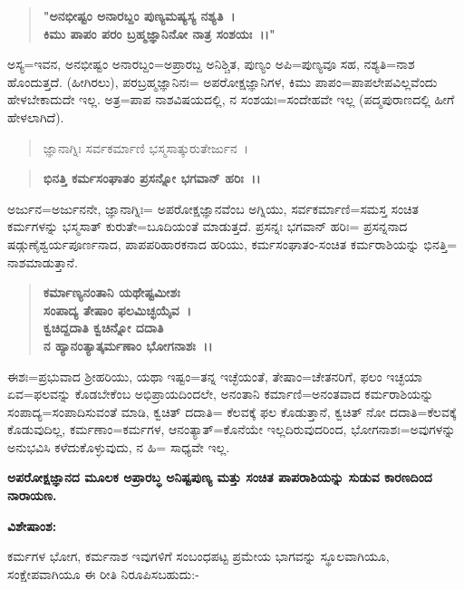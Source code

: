 \begin{verse}
\textbf{"ಅನಭೀಷ್ಟಂ ಅನಾರಬ್ದಂ ಪುಣ್ಯಮಷ್ಯಸ್ಯ ನಶ್ಯತಿ~।}\\\textbf{ಕಿಮು ಪಾಪಂ ಪರಂ ಬ್ರಹ್ಮಜ್ಞಾನಿನೋ ನಾತ್ರ ಸಂಶಯಃ~।।"}
\end{verse}


ಅಸ್ಯ=ಇವನ, ಅನಭೀಷ್ಟಂ ಅನಾರಬ್ದಂ=ಅಪ್ರಾರಬ್ದ ಅನಿಶ್ಚಿತ, ಪುಣ್ಯಂ ಅಪಿ=ಪುಣ್ಯವೂ ಸಹ, ನಶ್ಯತಿ=ನಾಶ ಹೊಂದುತ್ತದೆ. (ಹೀಗಿರಲು), ಪರಬ್ರಹ್ಮಜ್ಞಾನಿನಃ= ಅಪರೋಕ್ಷಜ್ಞಾನಿಗಳ, ಕಿಮು ಪಾಪಂ=ಪಾಪಲೇಪವಿಲ್ಲವೆಂದು ಹೇಳಬೇಕಾದುದೇ ಇಲ್ಲ. ಅತ್ರ=ಪಾಪ ನಾಶವಿಷಯದಲ್ಲಿ, ನ ಸಂಶಯಃ=ಸಂದೇಹವೇ ಇಲ್ಲ (ಪದ್ಮಪುರಾಣದಲ್ಲಿ ಹೀಗೆ ಹೇಳಲಾಗಿದೆ).

\begin{verse}
ಜ್ಞಾನಾಗ್ನಿಃ ಸರ್ವಕರ್ಮಾಣಿ ಭಸ್ಮಸಾತ್ಕುರುತೇರ್ಜುನ~।
\end{verse}


\begin{verse}
\textbf{ಭಿನತ್ತಿ ಕರ್ಮಸಂಘಾತಂ ಪ್ರಸನ್ನೋ ಭಗವಾನ್ ಹರಿಃ~।।}
\end{verse}

ಅರ್ಜುನ=ಅರ್ಜುನನೇ, ಜ್ಞಾನಾಗ್ನಿಃ= ಅಪರೋಕ್ಷಜ್ಞಾನವೆಂಬ ಅಗ್ನಿಯು, ಸರ್ವ\break ಕರ್ಮಾಣಿ=ಸಮಸ್ತ ಸಂಚಿತ ಕರ್ಮಗಳನ್ನು ಭಸ್ಮಸಾತ್ ಕುರುತೇ=ಬೂದಿಯಂತೆ ಮಾಡುತ್ತದೆ. ಪ್ರಸನ್ನಃ ಭಗವಾನ್ ಹರಿಃ= ಪ್ರಸನ್ನನಾದ ಷಡ್ಗುಣೈಶ್ವರ್ಯಪೂರ್ಣನಾದ, ಪಾಪಪರಿಹಾರಕನಾದ ಹರಿಯು, ಕರ್ಮಸಂಘಾತಂ-ಸಂಚಿತ ಕರ್ಮರಾಶಿಯನ್ನು ಭಿನತ್ತಿ= ನಾಶಮಾಡುತ್ತಾನೆ.

\begin{verse}
\textbf{ಕರ್ಮಾಣ್ಯನಂತಾನಿ ಯಥೇಷ್ಟಮೀಶಃ}\\\textbf{ಸಂಪಾದ್ಯ ತೇಷಾಂ ಫಲಮಿಚ್ಛಯೈವ~।}\\\textbf{ಕ್ವಚಿದ್ದದಾತಿ ಕ್ವಚಿನ್ನೋ ದದಾತಿ}\\\textbf{ನ ಹ್ಯಾನಂತ್ಯಾತ್ಕರ್ಮಣಾಂ ಭೋಗನಾಶಃ~।।}
\end{verse}

ಈಶಃ=ಪ್ರಭುವಾದ ಶ‍್ರೀಹರಿಯು, ಯಥಾ ಇಷ್ಟಂ=ತನ್ನ ಇಚ್ಛೆಯಂತೆ, ತೇಷಾಂ=ಚೇತನ\-ರಿಗೆ, ಫಲಂ ಇಚ್ಛಯಾ ಏವ=ಫಲವನ್ನು ಕೊಡಬೇಕೆಂಬ ಅಭಿಪ್ರಾಯದಿಂದಲೇ, ಅನಂತಾನಿ ಕರ್ಮಾಣಿ=ಅನಂತವಾದ ಕರ್ಮರಾಶಿಯನ್ನು ಸಂಪಾದ್ಯ=ಸಂಪಾದಿಸುವಂತೆ ಮಾಡಿ, ಕ್ವಚಿತ್ ದದಾತಿ= ಕೆಲವಕ್ಕೆ ಫಲ ಕೊಡುತ್ತಾನೆ, ಕ್ವಚಿತ್ ನೋ ದದಾತಿ=ಕೆಲವಕ್ಕೆ ಕೊಡುವುದಿಲ್ಲ, ಕರ್ಮಣಾಂ=ಕರ್ಮಗಳ, ಆನಂತ್ಯಾತ್=ಕೊನೆಯೇ ಇಲ್ಲದಿರುವುದರಿಂದ, ಭೋಗನಾಶಃ=\-ಅವುಗಳನ್ನು ಅನುಭವಿಸಿ ಕಳೆದುಕೊಳ್ಳುವುದು, ನ ಹಿ= ಸಾಧ್ಯವೇ ಇಲ್ಲ.

\begin{center}
\textbf{ಅಪರೋಕ್ಷಜ್ಞಾನದ ಮೂಲಕ ಅಪ್ರಾರಬ್ಧ ಅನಿಷ್ಟಪುಣ್ಯ ಮತ್ತು ಸಂಚಿತ ಪಾಪರಾಶಿಯನ್ನು ಸುಡುವ ಕಾರಣದಿಂದ ನಾರಾಯಣ.}
\end{center}

\noindent
\textbf{ವಿಶೇಷಾಂಶ:\enginline{-}}

ಕರ್ಮಗಳ ಭೋಗ, ಕರ್ಮನಾಶ ಇವುಗಳಿಗೆ ಸಂಬಂಧಪಟ್ಟ ಪ್ರಮೇಯ ಭಾಗವನ್ನು ಸ್ಥೂಲವಾಗಿಯೂ, ಸಂಕ್ಷೇಪವಾಗಿಯೂ ಈ ರೀತಿ ನಿರೂಪಿಸಬಹುದು:-

